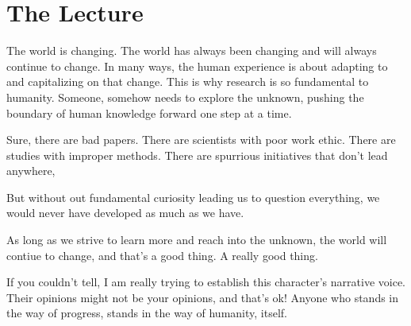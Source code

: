 \chapter{The Lecture}

The world is changing.
The world has always been changing and will always continue to change.
In many ways, the human experience is about adapting to and capitalizing on that change.
This is why research is so fundamental to humanity.
Someone, somehow needs to explore the unknown, pushing the boundary of human knowledge forward one step at a time.

Sure, there are bad papers.
There are scientists with poor work ethic.
There are studies with improper methods.
There are spurrious initiatives that don't lead anywhere,

But without out fundamental curiosity leading us to question everything, we would never have developed as much as we have.

As long as we strive to learn more and reach into the unknown, the world will contiue to change, and that's a good thing.
A really good thing.

\begin{noteblock}{If you couldn't tell, I am really trying to establish this character's narrative voice. Their opinions might not be your opinions, and that's ok!}
Anyone who stands in the way of progress, stands in the way of humanity, itself.
\end{noteblock}

